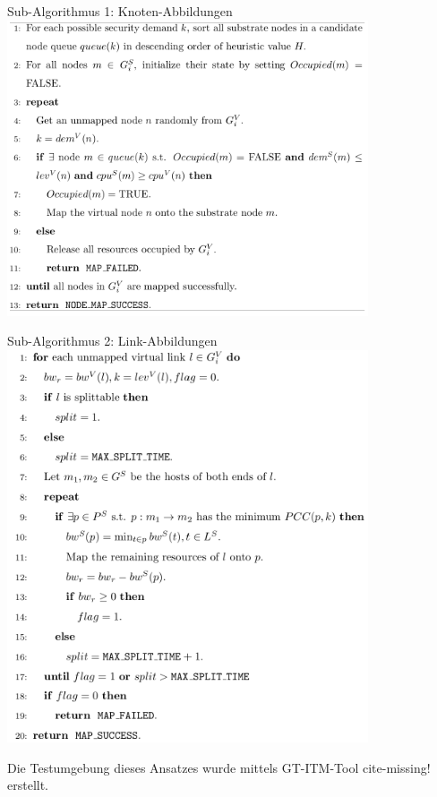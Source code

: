 \documentclass{lni}
\begin{document}
\newpage
\begin{center}
Sub-Algorithmus 1: Knoten-Abbildungen\newline
	\includegraphics[width=0.8\textwidth]{nodemapping.pdf}\newline
\end{center}
\newpage
\begin{center}
Sub-Algorithmus 2: Link-Abbildungen\newline
	\includegraphics[width=0.8\textwidth]{linkmapping.pdf}\newline
\end{center}

Die Testumgebung dieses Ansatzes wurde mittels GT-ITM-Tool cite-missing! erstellt. 
\end{document}
